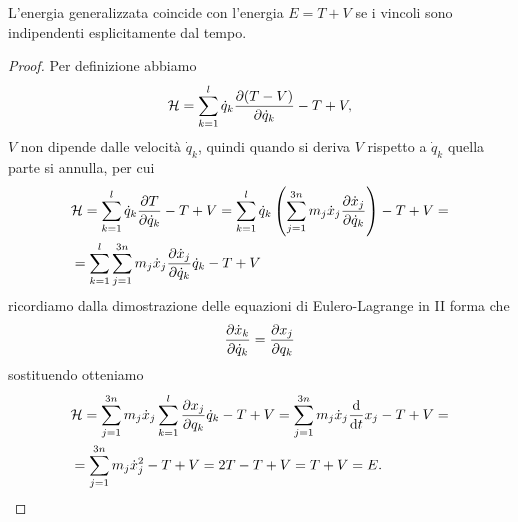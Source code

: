    \begin{theorem}
       L'energia generalizzata coincide con l'energia $E=T+V$ se i vincoli sono indipendenti esplicitamente dal tempo.
   \end{theorem}
   \begin{proof}
       Per definizione abbiamo 
       \begin{equation}
           \mathcal{H} = \sum_{k=1}^l \dot{q}_k \frac{\partial (T-V)}{\partial \dot{q}_k} - T+V,
       \end{equation}
       $V$ non dipende dalle velocità $\dot{q}_k$, quindi quando si deriva $V$ rispetto a $\dot{q}_k$ quella parte si annulla, per cui
       \begin{equation}
       \begin{aligned}
           &\mathcal{H} = \sum_{k=1}^l\dot{q}_k \frac{\partial T}{\partial \dot{q}_k} -T +V = \sum_{k=1}^l \dot{q}_k \left(\sum_{j=1}^{3n}m_j \dot{x}_j \frac{\partial \dot{x}_j}{\partial \dot{q}_k}\right) - T + V = \\
           & = \sum_{k=1}^l \sum_{j=1}^{3n} m_j \dot{x}_j \frac{\partial \dot{x}_j}{\partial \dot{q}_k}\dot{q}_k -T + V
           \end{aligned}
       \end{equation}
       ricordiamo dalla dimostrazione delle equazioni di Eulero-Lagrange in II forma che
       \begin{equation}
           \frac{\partial \dot{x}_k}{\partial \dot{q}_k} = \frac{\partial x_j}{\partial q_k}
       \end{equation}
       sostituendo otteniamo
       \begin{equation}
       \begin{aligned}
           &\mathcal{H} = \sum_{j=1}^{3n} m_j \dot{x}_j \sum_{k=1}^l \frac{\partial x_j}{\partial q_k}\dot{q}_k - T + V = \sum_{j=1}^{3n} m_j \dot{x}_j \frac{\mathrm{d}}{\mathrm{d}t} x_j - T + V = \\
           &=\sum_{j=1}^{3n} m_j \dot{x}^2_j - T + V = 2T-T+V =T+V= E.
           \end{aligned}
       \end{equation}      
   \end{proof}

